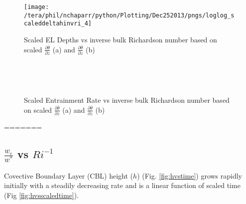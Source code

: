 \begin{figure}[htbp]
                \texttt{[image: /tera/phil/nchaparr/python/Plotting/Dec252013/pngs/loglog\_scaleddeltahinvri\_4]}\\
       
        \caption{Scaled EL Depths vs inverse bulk Richardson number based on scaled $\frac{\partial \overline{\theta}}{\partial z}$ (a) and $\frac{\partial \overline{\theta}}{\partial z}$ (b)}
        \label{fig:ELvsri}
\end{figure}

\begin{figure}[htbp]
\begin{minipage}[b]{0.5\linewidth}
        \\
        \end{minipage}             
\quad
\begin{minipage}[b]{0.5\linewidth}
        \\
       
       \end{minipage}
        \caption{Scaled Entrainment Rate vs inverse bulk Richardson number based on scaled $\frac{\partial \overline{\theta}}{\partial z}$ (a) and $\frac{\partial \overline{\theta}}{\partial z}$ (b)}
        \label{fig:scaledweinvri2}
\end{figure}
=======

\subsection{$\frac{w_{e}}{w^{*}}$ vs $Ri^{-1}$}
\FloatBarrier
Covective Boundary Layer (CBL) height ($h$) (Fig. \ref{fig:hvstime}) grows rapidly initially with a steadily decreasing rate
and is a linear function of scaled time (Fig \ref{fig:hvsscaledtime}).\\
  
